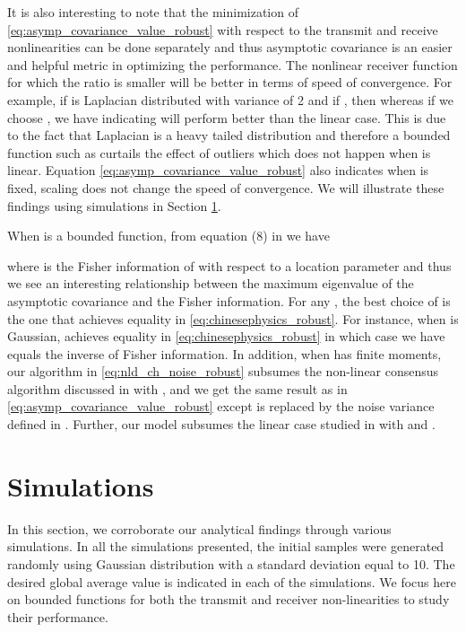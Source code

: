 \documentclass[onecolumn, draft, 12pt]{IEEEtran}
\begin{document}
It is also interesting to note that the minimization of \eqref{eq:asymp_covariance_value_robust} with respect to the transmit and receive nonlinearities can be done separately and thus asymptotic covariance is an easier and helpful metric in optimizing the performance. The nonlinear receiver function  for which the ratio  is smaller will be better in terms of speed of convergence. For example, if  is Laplacian distributed with variance of 2 and if , then  whereas if we choose , we have  indicating  will perform better than the linear case. This is due to the fact that Laplacian is a heavy tailed distribution and therefore a bounded function such as  curtails the effect of outliers which does not happen when  is linear. Equation \eqref{eq:asymp_covariance_value_robust} also indicates when  is fixed, scaling  does not change the speed of convergence. We will illustrate these findings using simulations in Section \ref{sec:simulations_nld_robust}. 

When  is a bounded function, from equation (8) in \cite{chinesephysics} we have

where  is the Fisher information of  with respect to a location parameter \cite[(8)]{zamir} and thus we see an interesting relationship between the maximum eigenvalue of the asymptotic covariance and the Fisher information. For any , the best choice of  is the one that achieves equality in \eqref{eq:chinesephysics_robust}. For instance, when  is Gaussian,  achieves equality in \eqref{eq:chinesephysics_robust} in which case we have   equals the inverse of Fisher information. In addition, when  has finite moments, our  algorithm in \eqref{eq:nld_ch_noise_robust} subsumes the non-linear consensus algorithm discussed in \cite{dastep2013} with , and we get the same result as in \eqref{eq:asymp_covariance_value_robust} except  is replaced by the noise variance  defined in \cite{dastep2013}. Further, our model subsumes the linear case studied in \cite{MinyiHuang2008} with  and . 

\section{Simulations} \label{sec:simulations_nld_robust}
In this section, we corroborate our analytical findings through various simulations. In all the simulations presented, the initial samples  were generated randomly using Gaussian distribution with a standard deviation equal to 10. The desired global average value is indicated in each of the simulations. We focus here on bounded functions for both the transmit and receiver non-linearities to study their performance. 
 
\end{document}
